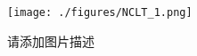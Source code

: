
\begin{figure}[ht]
\centering
\texttt{[image: ./figures/NCLT\_1.png]}
\caption{请添加图片描述} \label{NCLT_fig1}
\end{figure}